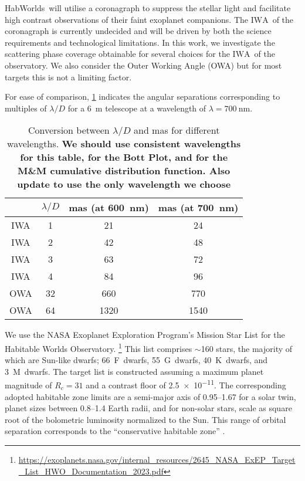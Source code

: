 \documentclass[
    usenatbib,
]{mnras}
\newcommand{\IWA}{\ensuremath{\mathrm{IWA}}}
\newcommand{\hwo}{HabWorlds}
\begin{document}
\hwo\ will utilise a coronagraph to suppress the stellar light and facilitate high contrast observations of their faint exoplanet companions.  The \IWA\ of the coronagraph is currently undecided and will be driven by both the science requirements and technological limitations. 
In this work, we investigate the scattering phase coverage obtainable for several choices for the \IWA\ of the observatory. We also consider the Outer Working Angle (OWA) but for most targets this is not a limiting factor.

For ease of comparison, \cref{tab:IWA_OWA} indicates the angular separations corresponding to multiples of $\lambda / D$ for a \SI{6}{\meter} telescope at a wavelength of $\lambda = \SI{700}{\nano\meter}$.

\begin{table}
    \centering
    \caption{
        Conversion between $\lambda / D$ and mas for different wavelengths. \textbf{We should use consistent wavelengths for this table, for the Bott Plot, and for the M\&M cumulative distribution function. Also update to use the only wavelength we choose}
    }
    \label{tab:IWA_OWA}
    \begin{tabular}{ c c c c } 
    \toprule
     & $\lambda/D$ & mas (at \SI{600}{\nano\meter}) & mas (at \SI{700}{\nano\meter}) \\
    \midrule
    \midrule
    IWA & 1 & 21 & 24\\
    IWA & 2 & 42 & 48\\
    IWA & 3 & 63 & 72\\
    IWA & 4& 84& 96\\
    \midrule
    OWA & 32 & 660 & 770 \\
    OWA & 64 & 1320 & 1540\\
    \bottomrule
    \end{tabular}
\end{table}


We use the NASA Exoplanet Exploration Program's Mission Star List for the Habitable Worlds Observatory.%
\footnote{\url{https://exoplanets.nasa.gov/internal_resources/2645_NASA_ExEP_Target_List_HWO_Documentation_2023.pdf}}
This list comprises $\sim$160 stars, the majority of which are Sun-like dwarfs; 66~F~dwarfs, 55~G~dwarfs, 40~K~dwarfs, and 3~M~dwarfs.
The target list is constructed assuming a maximum planet magnitude of $R_c = 31$ and a contrast floor of \num{2.5e-11}. %
The corresponding adopted habitable zone limits are a semi-major axis of \SIrange{0.95}{1.67}{\au} for a solar twin, planet sizes between \SIrange{0.8}{1.4}{} Earth radii, and for non-solar stars, scale as square root of the
bolometric luminosity normalized to the Sun. 
This range of orbital separation corresponds to the \enquote{conservative habitable zone} \citep{kasting93, kopparapu13}.
\end{document}
